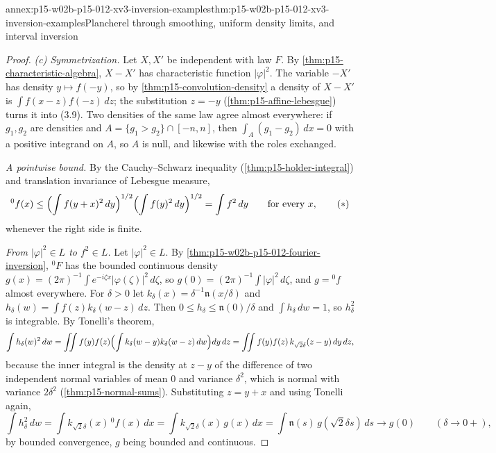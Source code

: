 \begin{annexitem}{annex:p15-w02b-p15-012-xv3-inversion-examples}{thm:p15-w02b-p15-012-xv3-inversion-examples}{Plancherel through smoothing, uniform density limits, and interval inversion}
\begin{proof}
\emph{(c) Symmetrization.} Let \(X,X'\) be independent with law \(F\). By
\cref{thm:p15-characteristic-algebra}, \(X-X'\) has characteristic function
\(|\varphi|^2\). The variable \(-X'\) has density \(y\mapsto f(-y)\), so by
\cref{thm:p15-convolution-density} a density of \(X-X'\) is
\(\int f(x-z)f(-z)\,dz\); the substitution \(z=-y\)
(\cref{thm:p15-affine-lebesgue}) turns it into (3.9). Two densities of the
same law agree almost everywhere: if \(g_1,g_2\) are densities and
\(A=\{g_1>g_2\}\cap[-n,n]\), then \(\int_A(g_1-g_2)\,dx=0\) with a positive
integrand on \(A\), so \(A\) is null, and likewise with the roles exchanged.

\emph{A pointwise bound.} By the Cauchy--Schwarz inequality
(\cref{thm:p15-holder-integral}) and translation invariance of Lebesgue
measure,
\[
 {}^0f(x)\leq\Bigl(\int f(y+x)^2\,dy\Bigr)^{1/2}\Bigl(\int f(y)^2\,dy\Bigr)^{1/2}
   =\int f^2\,dy\qquad\text{for every }x,
 \tag{\(\ast\)}
\]
whenever the right side is finite.

\emph{From \(|\varphi|^2\in L\) to \(f^2\in L\).} Let \(|\varphi|^2\in L\). By
\cref{thm:p15-w02b-p15-012-fourier-inversion}, \({}^0F\) has the bounded
continuous density
\(g(x)=(2\pi)^{-1}\int e^{-i\zeta x}|\varphi(\zeta)|^2\,d\zeta\), so
\(g(0)=(2\pi)^{-1}\int|\varphi|^2\,d\zeta\), and \(g={}^0f\) almost everywhere.
For \(\delta>0\) let \(k_\delta(x)=\delta^{-1}\mathfrak n(x/\delta)\) and
\(h_\delta(w)=\int f(z)k_\delta(w-z)\,dz\). Then \(0\leq h_\delta\leq\mathfrak n(0)/\delta\)
and \(\int h_\delta\,dw=1\), so \(h_\delta^2\) is integrable. By Tonelli's
theorem,
\[
 \int h_\delta(w)^2\,dw=\iint f(y)f(z)\Bigl(\int k_\delta(w-y)k_\delta(w-z)\,dw\Bigr)dy\,dz
   =\iint f(y)f(z)\,k_{\sqrt2\delta}(z-y)\,dy\,dz ,
\]
because the inner integral is the density at \(z-y\) of the difference of
two independent normal variables of mean \(0\) and variance \(\delta^2\),
which is normal with variance \(2\delta^2\) (\cref{thm:p15-normal-sums}).
Substituting \(z=y+x\) and using Tonelli again,
\[
 \int h_\delta^2\,dw=\int k_{\sqrt2\delta}(x)\,{}^0f(x)\,dx
   =\int k_{\sqrt2\delta}(x)\,g(x)\,dx=\int\mathfrak n(s)\,g(\sqrt2\delta s)\,ds
   \longrightarrow g(0)\qquad(\delta\to0+),
\]
by bounded convergence, \(g\) being bounded and continuous.


\end{proof}
\end{annexitem}
